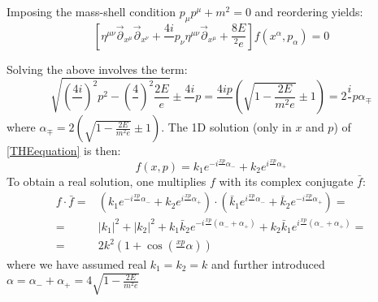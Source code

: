 \documentclass[twoside,a4paper,11pt]{article}
\numberwithin{equation}{section}
\newcommand{\parr}{\overset{\rightarrow}{\partial}}
\begin{document}
Imposing the mass-shell condition $p_\mu p^\mu + m^2 = 0$ and reordering yields:
\begin{equation}
     \left[ \eta^{\mu\nu}\parr_{x^\mu}\parr_{x^\nu}  + \frac{4i}{ } p_\nu \eta^{\mu\nu} \parr_{x^\mu}  + \frac{8E}{ ^2 e} \right] f \left(x^\alpha,p_\alpha \right) =  0
    \label{THEequation}
\end{equation}

Solving the above involves the term:
\begin{equation}
    \sqrt{\left( \frac{4i}{ }\right)^2 p^2 - \left( \frac{4}{ } \right)^2 \frac{2E}{e}} \pm \frac{4i}{ }p = \frac{4ip}{ } \left( \sqrt{ 1 - \frac{2E}{m^2 e}} \pm 1\right) = 2 \frac{i}{ } p \alpha_\mp 
\end{equation}
where $\alpha_\mp = 2 \left( \sqrt{1 - \frac{2E}{m^2 e}} \pm 1\right)$. The 1D solution (only in $x$ and $p$) of \ref{THEequation} is then:
\begin{equation}
    f(x,p) =  k_1 e^{-i\frac{xp}{ }\alpha_-} + k_2 e^{i\frac{xp}{ }\alpha_+}
\end{equation}
To obtain a real solution, one multiplies $f$ with its complex conjugate $\bar{f}$:
\begin{align}
    f \cdot  \bar{f} = & \left( k_1 e^{-i\frac{xp}{ }\alpha_-} + k_2 e^{i\frac{xp}{ }\alpha_+}\right) \cdot \left( \bar{k}_1 e^{i\frac{xp}{ }\alpha_-} + \bar{k}_2 e^{-i\frac{xp}{ }\alpha_+}\right) =\\
    = & |k_1|^2 + |k_2|^2 + k_1 \bar{k}_2 e^{-i\frac{xp}{ }(\alpha_- + \alpha_+)} +  k_2 \bar{k}_1 e^{i\frac{xp}{ }(\alpha_- + \alpha_+)} =\\
    = & 2 k^2 \left( 1 + \cos{\left(\frac{xp}{ } \alpha\right)} \right)
\end{align}
where we have assumed real $k_1 = k_2 = k$ and further introduced $\alpha = \alpha_- + \alpha_+ = 4 \sqrt{1 - \frac{2E}{m^2 e}} $

\iffalse
\end{document}
